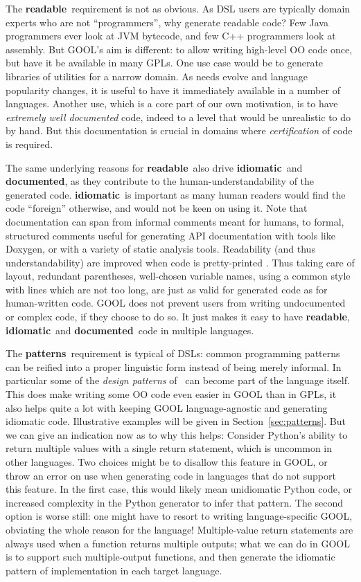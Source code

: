 \documentclass[sigplan,review,anonymous,prologue,dvipsnames]{acmart}
\newcommand{\abbrev}[1]{\textbf{#1}}
\newcommand{\readable}{\abbrev{readable}}
\newcommand{\idiomatic}{\abbrev{idiomatic}}
\newcommand{\documented}{\abbrev{documented}}
\newcommand{\oopatterns}{\abbrev{patterns}}
\begin{document}
The \readable~requirement is not as obvious. As DSL users are typically
domain experts who are not ``programmers'', why generate readable code?
Few Java programmers ever look at JVM bytecode, and few C++ programmers
look at assembly. But GOOL's aim is different: to allow writing
high-level OO code once, but have it be available in many GPLs. One use case
would be to generate libraries of utilities for a narrow domain. As needs
evolve and language popularity changes, it is useful to have it immediately
available in a number of languages. Another use, which is a core part of our
own motivation, is to have \emph{extremely well documented} code, indeed to
a level that would be unrealistic to do by hand. But this documentation is
crucial in domains where \emph{certification} of code is required.

The same underlying reasons for \readable~also drive \idiomatic~and \documented,
as they contribute to the human-understandability of the generated code.
\idiomatic~is important as many human readers would find the code ``foreign''
otherwise, and would not be keen on using it.
Note that documentation can span from informal comments meant for humans, to
formal, structured comments useful for generating API documentation with tools
like Doxygen, or with a variety of static analysis tools.
Readability (and thus understandability) are improved when code is pretty-printed%
\cite{buse2009learning}. Thus taking care of layout, redundant parentheses,
well-chosen variable names, using a common style with lines which are not too
long, are just as valid for generated code as for human-written code.
GOOL does not prevent users from writing undocumented or complex code, if they
choose to do so. It just makes it easy to have \readable, \idiomatic~and
\documented~code in multiple languages.

The \oopatterns~requirement is typical of DSLs: common programming patterns
can be reified into a proper linguistic form instead of being merely
informal. In particular some of the \emph{design patterns} of~\cite{gamma1995design}
can become part of the language itself. This does make writing some OO
code even easier in GOOL than in GPLs, it also helps quite a lot with
keeping GOOL language-agnostic and generating idiomatic code. Illustrative
examples will be given in Section~\ref{sec:patterns}.  But we can give an
indication now as to why this helps: Consider Python's 
ability to return multiple values with a single return statement, which
is uncommon in other languages.  Two choices might be to disallow this
feature in GOOL, or throw an error on use when generating code in languages
that do not support this feature. In the first case, this would likely mean
unidiomatic Python code, or increased complexity in the Python generator to
infer that pattern. The second option is worse still: one might have to resort
to writing language-specific GOOL, obviating the whole reason for the language!
Multiple-value return statements are always used when a function returns multiple
outputs; what we can do in GOOL is to support such multiple-output functions, 
and
then generate the idiomatic pattern of implementation in each target language.
\end{document}
